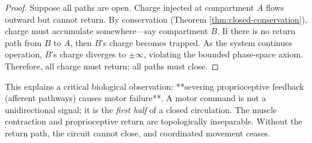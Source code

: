 \begin{proof}
Suppose all paths are open. Charge injected at compartment $A$ flows outward but cannot return. By conservation (Theorem \ref{thm:closed-conservation}), charge must accumulate somewhere—say compartment $B$. If there is no return path from $B$ to $A$, then $B$'s charge becomes trapped. As the system continues operation, $B$'s charge diverges to $\pm\infty$, violating the bounded phase-space axiom. Therefore, all charge must return; all paths must close.
\end{proof}

This explains a critical biological observation: **severing proprioceptive feedback (afferent pathways) causes motor failure**. A motor command is not a unidirectional signal; it is the \emph{first half} of a closed circulation. The muscle contraction and proprioceptive return are topologically inseparable. Without the return path, the circuit cannot close, and coordinated movement ceases.

